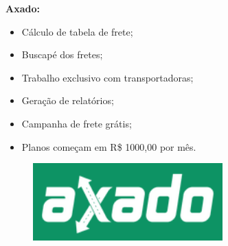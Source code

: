		\begin{minipage}{0.48\textwidth}
			
			\textbf{Axado:}
				\begin{itemize}
					\item Cálculo de tabela de frete;
					\item Buscapé dos fretes;
					\item Trabalho exclusivo com transportadoras;
					\item Geração de relatórios;
					\item Campanha de frete grátis;
					\item Planos começam em R\$ 1000,00 por mês.
				\end{itemize}
		\end{minipage}
		\begin{minipage}{0.48\textwidth}
			
			\begin{figure}[H]
				\centering
				\includegraphics[width=0.65\textwidth]{img/axado.png}
			\end{figure}
            
		\end{minipage}
        \bigskip
        
        
				
